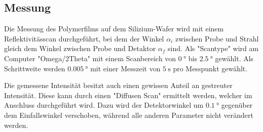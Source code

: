 \subsection{Messung}
Die Messung des Polymerfilms auf dem Silizium-Wafer wird mit einem Reflektivitässcan durchgeführt, bei dem der Winkel $\alpha_i$ zwischen Probe und Strahl gleich dem
Winkel zwischen Probe und Detaktor $\alpha_f$ sind. Als "Scantype" wird am Computer "Omega/2Theta" mit einem Scanbereich von $\SI{0}{\degree}$ bis $\SI{2,5}{\degree}$ gewählt.
Als Schrittweite werden $\SI{0,005}{\degree}$ mit einer Messzeit von $\SI{5}{\s}$ pro Messpunkt gewählt.

Die gemessene Intensität besitzt auch einen gewissen Anteil an gestreuter Intensität. Diese kann durch einen "Diffusen Scan" ermittelt werden, welcher im Anschluss durchgeführt wird.
Dazu wird der Detektorwinkel um $\SI{0,1}{\degree}$ gegenüber dem Einfallswinkel verschoben, während alle anderen Parameter nicht verändert werden.

